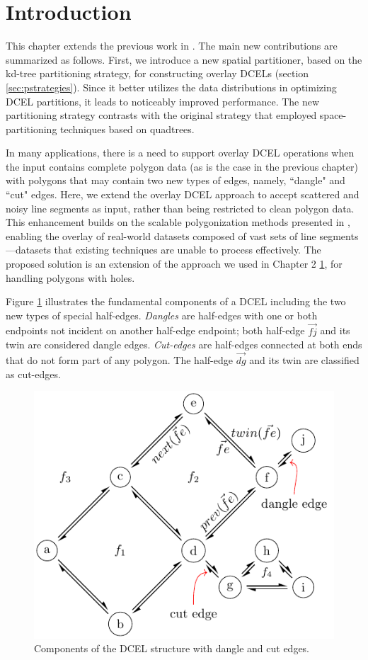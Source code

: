 \section{Introduction} %

This chapter extends the previous work in \cite{calderon_scalable_2023}. The main new contributions are summarized as follows. First, we introduce a new spatial partitioner, based on the kd-tree partitioning strategy, for constructing overlay  DCELs (section \ref{sec:pstrategies}). Since it better utilizes the data distributions in optimizing DCEL partitions, it leads to noticeably improved performance. The new partitioning strategy contrasts with the original strategy that employed space-partitioning techniques based on quadtrees. 

In many applications, there is a need to support overlay DCEL operations when the input contains complete polygon data (as is the case in the previous chapter) with polygons that may contain two new types of edges, namely, ``dangle" and ``cut" edges. Here, we extend the overlay DCEL approach to accept scattered and noisy line segments as input, rather than being restricted to clean polygon data. This enhancement builds on the scalable polygonization methods presented in \cite{abdelhafeez_ddcel_2023}, enabling the overlay of real-world datasets composed of vast sets of line segments —datasets that existing techniques are unable to process effectively. The proposed solution is an extension of the approach we used in Chapter 2 \ref{}, for handling polygons with holes.


Figure \ref{fig:extension_dcel_example} illustrates the fundamental components of a DCEL including the two new types of special half-edges. \textit{Dangles} are half-edges with one or both endpoints not incident on another half-edge endpoint; both half-edge $\overrightarrow{fj}$ and its twin are considered dangle edges. \textit{Cut-edges} are half-edges connected at both ends that do not form part of any polygon. The half-edge $\overrightarrow{dg}$ and its twin are classified as cut-edges.

\begin{figure}
    \centering
    \includegraphics[width=0.6\linewidth]{chapterExtension/dcel_example2}
    \caption{Components of the DCEL structure with dangle and cut edges.}\label{fig:extension_dcel_example}
\end{figure}

